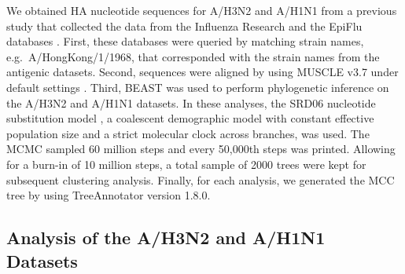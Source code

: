 \documentclass[11pt,oneside,letterpaper]{article}
\begin{document}
We obtained HA nucleotide sequences for A/H3N2 and A/H1N1 from a previous study \cite{bedford_integrating_2014} that collected the data from the Influenza Research \cite{IRD} and the EpiFlu databases \cite{GISAID}. 
First, these databases were queried by matching strain names, e.g.\ A/HongKong/1/1968, that corresponded with the strain names from the antigenic datasets.
Second, sequences were aligned by using MUSCLE v3.7 under default settings \cite{MUSCLE}.
Third, BEAST\cite{BEAST17} was used to perform phylogenetic inference on the A/H3N2 and A/H1N1 datasets.
In these analyses, the SRD06 nucleotide substitution model \cite{Shapiro06}, a coalescent demographic model with constant effective population size and a strict molecular clock across branches, was used.
The MCMC sampled 60 million steps and every 50,000th steps was printed.
Allowing for a burn-in of 10 million steps, a total sample of 2000 trees were kept for subsequent clustering analysis.
Finally, for each analysis, we generated the MCC tree by using TreeAnnotator version 1.8.0.





\subsection*{Analysis of the A/H3N2 and A/H1N1 Datasets}
	
\end{document}
